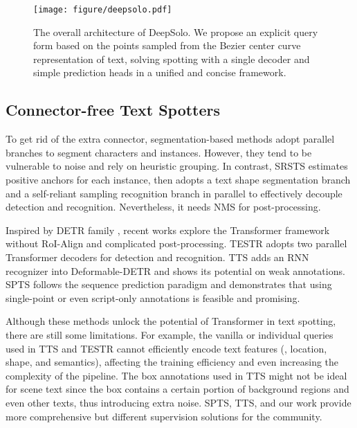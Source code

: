 \documentclass[10pt,twocolumn,letterpaper]{article}
\begin{document}
\begin{figure*}[!t]
    \centering
    \texttt{[image: figure/deepsolo.pdf]}
    \caption{The overall architecture of DeepSolo. We propose an explicit query form based on the points sampled from the Bezier center curve representation of text, solving spotting with a single decoder and simple prediction heads in a unified and concise framework.}
    \label{fig:model}
\end{figure*}


\subsection{Connector-free Text Spotters}
\label{subsubsec:connector-free}
To get rid of the extra connector, segmentation-based methods \cite{xing2019convolutional,wang2021pgnet} adopt parallel branches to segment characters and instances. However, they tend to be vulnerable to noise and rely on heuristic grouping. In contrast, SRSTS \cite{wu2022decoupling} estimates positive anchors for each instance, then adopts a text shape segmentation branch and a self-reliant sampling recognition branch in parallel to effectively decouple detection and recognition. Nevertheless, it needs NMS for post-processing. 

Inspired by DETR family \cite{carion2020end, zhu2020deformable}, recent works \cite{kittenplon2022towards,peng2022spts,zhang2022text} explore the Transformer framework without RoI-Align and complicated post-processing. TESTR \cite{zhang2022text} adopts two parallel Transformer decoders for detection and recognition. TTS \cite{kittenplon2022towards} adds an RNN recognizer into Deformable-DETR \cite{zhu2020deformable} and shows its potential on weak annotations. SPTS \cite{peng2022spts} follows the sequence prediction paradigm \cite{chen2021pix2seq} and demonstrates that using single-point or even script-only annotations is feasible and promising. 

Although these methods unlock the potential of Transformer in text spotting, there are still some limitations. For example, the vanilla or individual queries used in TTS and TESTR cannot efficiently encode text features (\eg, location, shape, and semantics), affecting the training efficiency \cite{ye2022dptext} and even increasing the complexity of the pipeline. The box annotations used in TTS might not be ideal \cite{peng2022spts} for scene text since the box contains a certain portion of background regions and even other texts, thus introducing extra noise. SPTS, TTS, and our work provide more comprehensive but different supervision solutions for the community.
\end{document}
